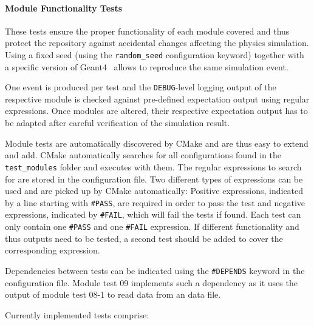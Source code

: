 \paragraph{Module Functionality Tests}

These tests ensure the proper functionality of each module covered and thus protect the repository against accidental changes affecting the physics simulation.
Using a fixed seed (using the \texttt{random\_seed} configuration keyword) together with a specific version of Geant4~\cite{geant4} allows to reproduce the same simulation event.

One event is produced per test and the \texttt{DEBUG}-level logging output of the respective module is checked against pre-defined expectation output using regular expressions.
Once modules are altered, their respective expectation output has to be adapted after careful verification of the simulation result.

Module tests are automatically discovered by CMake and are thus easy to extend and add.
CMake automatically searches for all configurations found in the \texttt{test\_modules} folder and executes \apsq with them.
The regular expressions to search for are stored in the configuration file.
Two different types of expressions can be used and are picked up by CMake automatically: Positive expressions, indicated by a line starting with \texttt{\#PASS}, are required in order to pass the test and negative expressions, indicated by \texttt{\#FAIL}, which will fail the tests if found.
Each test can only contain one \texttt{\#PASS} and one \texttt{\#FAIL} expression.
If different functionality and thus outputs need to be tested, a second test should be added to cover the corresponding expression.

Dependencies between tests can be indicated using the \texttt{\#DEPENDS} keyword in the configuration file.
Module test 09 implements such a dependency as it uses the output of module test 08-1 to read data from an \apsq data file.

Currently implemented tests comprise:

